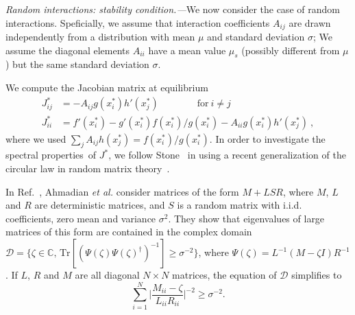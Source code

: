 \emph{Random interactions: stability condition.---}We now consider the case of random interactions.
Speficially, we assume that interaction coefficients $A_{ij}$ are drawn independently from a distribution with mean $\mu$ and standard deviation $\sigma$;
We assume the diagonal elements $A_{ii}$ have a mean value $\mu_s$ (possibly different from $\mu$) but the same standard deviation $\sigma$. 
 
We compute the Jacobian matrix at equilibrium
\begin{align}
    J_{ij}^* & = - A_{ij}g(x_i^*)h'(x_j^*) \qquad \qquad \textrm{for} \ i\neq j \label{eq: jac off-diag}\\
    J_{ii}^* & = f'(x_i^*) - g'(x_i^*)f(x_i^*)/g(x_i^*) - A_{ii}g(x_i^*)h'(x_j^*) \ , \label{eq: jac diag}
\end{align}
where we used $\sum_{j}A_{ij}h(x_j^*)=f(x_i^*)/g(x_i^*)$.
In order to investigate the spectral properties of $J^*$, 
we follow Stone~\cite{Stone2018} in using a recent generalization of the circular law in random matrix theory~\cite{Ahmadian2015}.

In Ref.~\cite{Ahmadian2015}, Ahmadian \emph{et al.} consider matrices of the form $M + LSR$, where $M$,  
$L$ and $R$ are deterministic matrices, and $S$ is a random matrix with i.i.d. coefficients, zero mean and variance $\sigma^2$.
They show that eigenvalues of large matrices of this form are contained in the complex domain $\mathcal{D} = \{\zeta \in \mathbb{C},\, \textrm{Tr}[(\Psi(\zeta) \Psi(\zeta)^\dagger)^{-1}]\geq \sigma^{-2}\}$, where $\Psi(\zeta) = L^{-1}(M-\zeta I)R^{-1}$. If $L$, $R$ and $M$ are all diagonal $N\times N$ matrices, the equation of $\mathcal{D}$ simplifies to 
\begin{equation}
    \sum_{i=1}^N\Big\vert\frac{M_{ii} - \zeta}{L_{ii}R_{ii}}\Big\vert^{-2}\geq \sigma^{-2}.
\label{eq: domain}
\end{equation}


